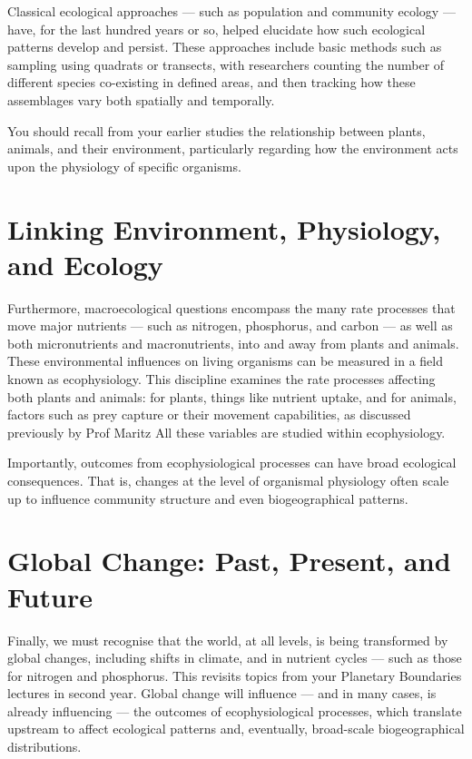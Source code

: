 \documentclass[
  10pt,
]{book}
\begin{document}
Classical ecological approaches --- such as population and community
ecology --- have, for the last hundred years or so, helped elucidate how
such ecological patterns develop and persist. These approaches include
basic methods such as sampling using quadrats or transects, with
researchers counting the number of different species co-existing in
defined areas, and then tracking how these assemblages vary both
spatially and temporally.

You should recall from your earlier studies the relationship between
plants, animals, and their environment, particularly regarding how the
environment acts upon the physiology of specific organisms.

\section{Linking Environment, Physiology, and
Ecology}\label{linking-environment-physiology-and-ecology}

Furthermore, macroecological questions encompass the many rate processes
that move major nutrients --- such as nitrogen, phosphorus, and carbon
--- as well as both micronutrients and macronutrients, into and away
from plants and animals. These environmental influences on living
organisms can be measured in a field known as ecophysiology. This
discipline examines the rate processes affecting both plants and
animals: for plants, things like nutrient uptake, and for animals,
factors such as prey capture or their movement capabilities, as
discussed previously by Prof Maritz All these variables are studied
within ecophysiology.

Importantly, outcomes from ecophysiological processes can have broad
ecological consequences. That is, changes at the level of organismal
physiology often scale up to influence community structure and even
biogeographical patterns.

\section{Global Change: Past, Present, and
Future}\label{global-change-past-present-and-future}

Finally, we must recognise that the world, at all levels, is being
transformed by global changes, including shifts in climate, and in
nutrient cycles --- such as those for nitrogen and phosphorus. This
revisits topics from your Planetary Boundaries lectures in second year.
Global change will influence --- and in many cases, is already
influencing --- the outcomes of ecophysiological processes, which
translate upstream to affect ecological patterns and, eventually,
broad-scale biogeographical distributions.
\end{document}

